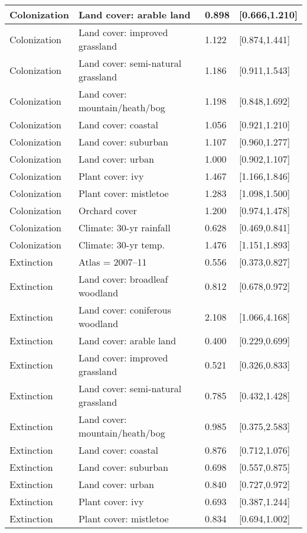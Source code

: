 \documentclass[a4paper, nobind]{templates/ociamthesis}
\begin{document}
\begin{longtable}{l|l|l|l}
\hline
Colonization & Land cover: arable land & 0.898 & [0.666,1.210]\\
\hline
Colonization & Land cover: improved grassland & 1.122 & [0.874,1.441]\\
\hline
Colonization & Land cover: semi-natural grassland & 1.186 & [0.911,1.543]\\
\hline
Colonization & Land cover: mountain/heath/bog & 1.198 & [0.848,1.692]\\
\hline
Colonization & Land cover: coastal & 1.056 & [0.921,1.210]\\
\hline
Colonization & Land cover: suburban & 1.107 & [0.960,1.277]\\
\hline
Colonization & Land cover: urban & 1.000 & [0.902,1.107]\\
\hline
Colonization & Plant cover: ivy & 1.467 & [1.166,1.846]\\
\hline
Colonization & Plant cover: mistletoe & 1.283 & [1.098,1.500]\\
\hline
Colonization & Orchard cover & 1.200 & [0.974,1.478]\\
\hline
Colonization & Climate: 30-yr rainfall & 0.628 & [0.469,0.841]\\
\hline
Colonization & Climate: 30-yr temp. & 1.476 & [1.151,1.893]\\
\hline
Extinction & Atlas = 2007–11 & 0.556 & [0.373,0.827]\\
\hline
Extinction & Land cover: broadleaf woodland & 0.812 & [0.678,0.972]\\
\hline
Extinction & Land cover: coniferous woodland & 2.108 & [1.066,4.168]\\
\hline
Extinction & Land cover: arable land & 0.400 & [0.229,0.699]\\
\hline
Extinction & Land cover: improved grassland & 0.521 & [0.326,0.833]\\
\hline
Extinction & Land cover: semi-natural grassland & 0.785 & [0.432,1.428]\\
\hline
Extinction & Land cover: mountain/heath/bog & 0.985 & [0.375,2.583]\\
\hline
Extinction & Land cover: coastal & 0.876 & [0.712,1.076]\\
\hline
Extinction & Land cover: suburban & 0.698 & [0.557,0.875]\\
\hline
Extinction & Land cover: urban & 0.840 & [0.727,0.972]\\
\hline
Extinction & Plant cover: ivy & 0.693 & [0.387,1.244]\\
\hline
Extinction & Plant cover: mistletoe & 0.834 & [0.694,1.002]\\

\end{longtable}
\end{document}
